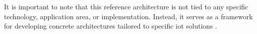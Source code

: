 \documentclass[preprint, review, 12pt]{elsarticle}
\begin{document}
It is important to note that this reference architecture is not tied to any specific technology, application area, or implementation. Instead, it serves as a framework for developing concrete architectures tailored to specific \gls{iot} solutions \cite{bassi2013}.










\end{document}
